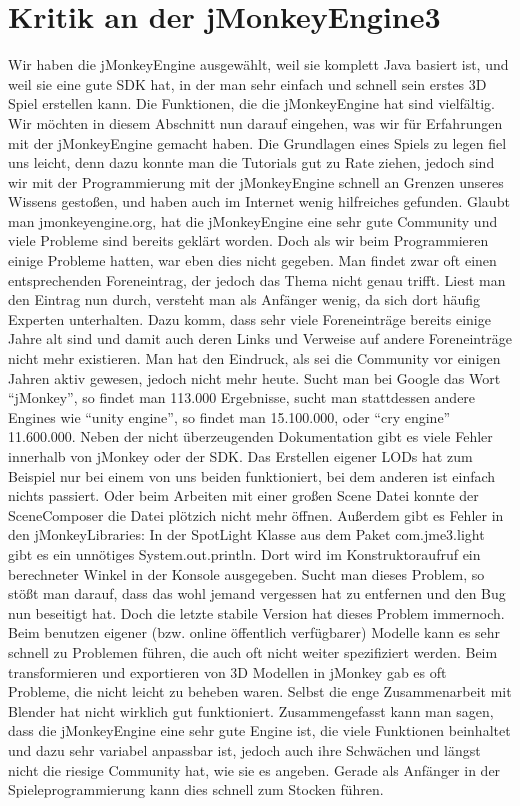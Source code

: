 \section{Kritik an der jMonkeyEngine3}
Wir haben die jMonkeyEngine ausgewählt, weil sie komplett Java basiert ist, und weil sie eine gute SDK hat, in der man sehr einfach und schnell sein erstes 3D Spiel erstellen kann. Die Funktionen, die die jMonkeyEngine hat sind vielfältig. Wir möchten in diesem Abschnitt nun darauf eingehen, was wir für Erfahrungen mit der jMonkeyEngine gemacht haben. Die Grundlagen eines Spiels zu legen fiel uns leicht, denn dazu konnte man die Tutorials gut zu Rate ziehen, jedoch sind wir mit der Programmierung mit der jMonkeyEngine schnell an Grenzen unseres Wissens gestoßen, und haben auch im Internet wenig hilfreiches gefunden. Glaubt man jmonkeyengine.org, hat die jMonkeyEngine eine sehr gute Community und viele Probleme sind bereits geklärt worden. Doch als wir beim Programmieren einige Probleme hatten, war eben dies nicht gegeben. Man findet zwar oft einen entsprechenden Foreneintrag, der jedoch das Thema nicht genau trifft. Liest man den Eintrag nun durch, versteht man als Anfänger wenig, da sich dort häufig Experten unterhalten. Dazu komm, dass sehr viele Foreneinträge bereits einige Jahre alt sind und damit auch deren Links und Verweise auf andere Foreneinträge nicht mehr existieren. Man hat den Eindruck, als sei die Community vor einigen Jahren aktiv gewesen, jedoch nicht mehr heute. Sucht man bei Google das Wort \enquote{jMonkey}, so findet man 113.000 Ergebnisse, sucht man stattdessen andere Engines wie \enquote{unity engine}, so findet man 15.100.000, oder \enquote{cry engine} 11.600.000. Neben der nicht überzeugenden Dokumentation gibt es viele Fehler innerhalb von jMonkey oder der SDK. Das Erstellen eigener LODs hat zum Beispiel nur bei einem von uns beiden funktioniert, bei dem anderen ist einfach nichts passiert. Oder beim Arbeiten mit einer großen Scene Datei konnte der SceneComposer die Datei plötzich nicht mehr öffnen. Außerdem gibt es Fehler in den jMonkeyLibraries: In der SpotLight Klasse aus dem Paket com.jme3.light gibt es ein unnötiges System.out.println. Dort wird im Konstruktoraufruf ein berechneter Winkel in der Konsole ausgegeben. Sucht man dieses Problem, so stößt man darauf, dass das wohl jemand vergessen hat zu entfernen und den Bug nun beseitigt hat. Doch die letzte stabile Version hat dieses Problem immernoch. Beim benutzen eigener (bzw. online öffentlich verfügbarer) Modelle kann es sehr schnell zu Problemen führen, die auch oft nicht weiter spezifiziert werden. Beim transformieren und exportieren von 3D Modellen in jMonkey gab es oft Probleme, die nicht leicht zu beheben waren. Selbst die enge Zusammenarbeit mit Blender hat nicht wirklich gut funktioniert.
Zusammengefasst kann man sagen, dass die jMonkeyEngine eine sehr gute Engine ist, die viele Funktionen beinhaltet und dazu sehr variabel anpassbar ist, jedoch auch ihre Schwächen und längst nicht die riesige Community hat, wie sie es angeben. Gerade als Anfänger in der Spieleprogrammierung kann dies schnell zum Stocken führen.

